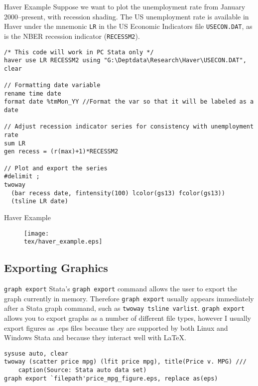 \documentclass[fleqn, handout, 10pt]{beamer}
\def\tex{S:/trainings/stata/tex}
\def\lst{\lstinline}
\begin{document}
\begin{frame}[fragile]{Haver Example}
    Suppose we want to plot the unemployment rate from January 2000--present, with recession shading. The US unemployment rate is available in Haver under the mnemonic \texttt{LR} in the US Economic Indicators file \texttt{USECON.DAT}, as is the NBER recession indicator (\texttt{RECESSM2}).
    \pause

    \begin{lstlisting}
/* This code will work in PC Stata only */
haver use LR RECESSM2 using "G:\Deptdata\Research\Haver\USECON.DAT", clear

// Formatting date variable
rename time date
format date %tmMon_YY //Format the var so that it will be labeled as a date

// Adjust recession indicator series for consistency with unemployment rate
sum LR
gen recess = (r(max)+1)*RECESSM2

// Plot and export the series
#delimit ;
twoway
  (bar recess date, fintensity(100) lcolor(gs13) fcolor(gs13))
  (tsline LR date)
    \end{lstlisting}
\end{frame}

\begin{frame}{Haver Example}
    \begin{figure}
	   \texttt{[image: \\tex/haver\_example.eps]}
    \end{figure}
\end{frame}


\subsection{Exporting Graphics}
\begin{frame}[fragile]{\lst=graph export=}
    Stata's \lst=graph export= command allows the user to export the graph currently in memory. Therefore \lst=graph export= usually appears
    immediately after a Stata graph command, such as \lst+twoway tsline varlist+. \lst=graph export= allows you to export graphs as a number
    of different file types, however I usually export figures as .eps files because they are supported by both Linux and Windows Stata and because
    they interact well with \LaTeX{}.
    \begin{lstlisting}
sysuse auto, clear
twoway (scatter price mpg) (lfit price mpg), title(Price v. MPG) ///
    caption(Source: Stata auto data set)
graph export `filepath'price_mpg_figure.eps, replace as(eps)
    \end{lstlisting}

\end{frame}
\end{document}
